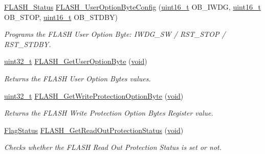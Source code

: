 \begin{DoxyCompactItemize}
\hyperlink{group___f_l_a_s_h___exported___types_gadc63a6f3404ff1f71229a66915e9cdc0}{F\+L\+A\+S\+H\+\_\+\+Status} \hyperlink{group___f_l_a_s_h___exported___functions_gaae1c493bb06c930ceb84dedfdb7325f6}{F\+L\+A\+S\+H\+\_\+\+User\+Option\+Byte\+Config} (\hyperlink{_p_e___types_8h_a1f1825b69244eb3ad2c7165ddc99c956}{uint16\+\_\+t} O\+B\+\_\+\+I\+W\+DG, \hyperlink{_p_e___types_8h_a1f1825b69244eb3ad2c7165ddc99c956}{uint16\+\_\+t} O\+B\+\_\+\+S\+T\+OP, \hyperlink{_p_e___types_8h_a1f1825b69244eb3ad2c7165ddc99c956}{uint16\+\_\+t} O\+B\+\_\+\+S\+T\+D\+BY)
\begin{DoxyCompactList}\small\item\em Programs the F\+L\+A\+SH User Option Byte\+: I\+W\+D\+G\+\_\+\+SW / R\+S\+T\+\_\+\+S\+T\+OP / R\+S\+T\+\_\+\+S\+T\+D\+BY. \end{DoxyCompactList}\item 
\hyperlink{_p_e___types_8h_a33594304e786b158f3fb30289278f5af}{uint32\+\_\+t} \hyperlink{group___f_l_a_s_h___exported___functions_ga31441647fac5fbb38369613076737943}{F\+L\+A\+S\+H\+\_\+\+Get\+User\+Option\+Byte} (\hyperlink{usb__devapi_8h_afabf60e7f57651d6d595a02c75f07cd0}{void})
\begin{DoxyCompactList}\small\item\em Returns the F\+L\+A\+SH User Option Bytes values. \end{DoxyCompactList}\item 
\hyperlink{_p_e___types_8h_a33594304e786b158f3fb30289278f5af}{uint32\+\_\+t} \hyperlink{group___f_l_a_s_h___exported___functions_gac009e061562c7d36d7d2d00bb1c8aafa}{F\+L\+A\+S\+H\+\_\+\+Get\+Write\+Protection\+Option\+Byte} (\hyperlink{usb__devapi_8h_afabf60e7f57651d6d595a02c75f07cd0}{void})
\begin{DoxyCompactList}\small\item\em Returns the F\+L\+A\+SH Write Protection Option Bytes Register value. \end{DoxyCompactList}\item 
\hyperlink{agilefox_2library_2inc_2stm32f10x__type_8h_a89136caac2e14c55151f527ac02daaff}{Flag\+Status} \hyperlink{group___f_l_a_s_h___exported___functions_ga57fe56770ff25b358f3e36bd70632e37}{F\+L\+A\+S\+H\+\_\+\+Get\+Read\+Out\+Protection\+Status} (\hyperlink{usb__devapi_8h_afabf60e7f57651d6d595a02c75f07cd0}{void})
\begin{DoxyCompactList}\small\item\em Checks whether the F\+L\+A\+SH Read Out Protection Status is set or not. \end{DoxyCompactList}\item 

\end{DoxyCompactItemize}
